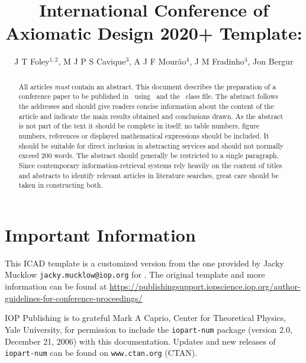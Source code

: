 \documentclass[a4paper]{jpconf}
\begin{document}
\title{International Conference of Axiomatic Design 2020+ Template: \jpcs}

\author{J T Foley$^{1,2}$, M J P S Cavique$^{3}$, A J F Mourão$^{4}$, J M Fradinho$^{4}$, Jon Bergur}

\address{$^{1}$Reykjavik University, Menntavegur 1, Reykjavik 102, Iceland}
\address{$^{2}$Massachusetts Institute of Technology, 77 Massachusetts Ave, Cambridge MA 02139, USA}
\address{$^{3}$Naval Academy (PT), Department of Sciences and Technology, Base Naval --- Alfeite, Almada, 2810-001, Portugal}
\address{$^{4}$Faculdade de Ci\^{e}ncias e Technologia, Universidade Nova De Lisboa, 2829-516 Caparica, Portugal}

\begin{abstract}
  All articles {\it must} contain an abstract.
This document describes the preparation of a conference paper to be published in \jpcs\ using \LaTeXe\ and the \cls\ class file.
The abstract follows the addresses and should give readers concise information about the content of the article and indicate the main results obtained and conclusions drawn.
As the abstract is not part of the text it should be complete in itself; no table numbers, figure numbers, references or displayed mathematical expressions should be included.
It should be suitable for direct inclusion in abstracting services and should not normally exceed 200 words.
The abstract should generally be restricted to a single paragraph.
Since contemporary information-retrieval systems rely heavily on the content of titles and abstracts to identify relevant articles in literature searches, great care should be taken in constructing both.
\end{abstract}

\section*{Important Information}
This ICAD template is a customized version from the one provided by Jacky Mucklow \texttt{jacky.mucklow@iop.org} for \jpcs.
The original template and more information can be found at \url{https://publishingsupport.iopscience.iop.org/author-guidelines-for-conference-proceedings/}

IOP Publishing is to grateful Mark A Caprio, Center for Theoretical Physics, Yale University, for permission to include the {\tt iopart-num} \BibTeX package (version 2.0, December 21, 2006) with  this documentation. Updates and new releases of {\tt iopart-num} can be found on \verb"www.ctan.org" (CTAN). 
\end{document}
